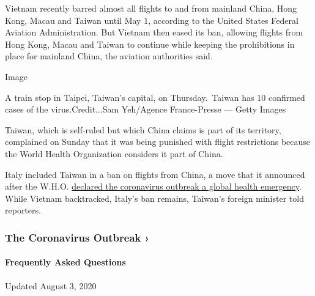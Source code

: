 Vietnam recently barred almost all flights to and from mainland China,
Hong Kong, Macau and Taiwan until May 1, according to the United States
Federal Aviation Administration. But Vietnam then eased its ban,
allowing flights from Hong Kong, Macau and Taiwan to continue while
keeping the prohibitions in place for mainland China, the aviation
authorities said.

Image

A train stop in Taipei, Taiwan's capital, on Thursday.~Taiwan has 10
confirmed cases of the virus.Credit...Sam Yeh/Agence France-Presse ---
Getty Images

Taiwan, which is self-ruled but which China claims is part of its
territory, complained on Sunday that it was being punished with flight
restrictions because the World Health Organization considers it part of
China.

Italy included Taiwan in a ban on flights from China, a move that it
announced after the W.H.O.
\href{https://www.nytimes3xbfgragh.onion/2020/01/30/health/coronavirus-world-health-organization.html}{declared
the coronavirus outbreak a global health emergency}. While Vietnam
backtracked, Italy's ban remains, Taiwan's foreign minister told
reporters.

\href{https://www.nytimes3xbfgragh.onion/news-event/coronavirus?action=click\&pgtype=Article\&state=default\&region=MAIN_CONTENT_3\&context=storylines_faq}{}

\hypertarget{the-coronavirus-outbreak-}{%
\subsubsection{The Coronavirus Outbreak
›}\label{the-coronavirus-outbreak-}}

\hypertarget{frequently-asked-questions}{%
\paragraph{Frequently Asked
Questions}\label{frequently-asked-questions}}

Updated August 3, 2020

